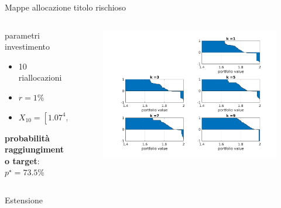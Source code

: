 \begin{frame}{Mappe allocazione titolo rischioso}
	\begin{columns}
		\begin{column}{0.4\textwidth}
			\begin{block}{parametri investimento}
				\begin{itemize}
					\item 10 riallocazioni 
					\item $r=1\%$
					\item $X_{10} = [1.07^4,\infty]$
				\end{itemize}
			\end{block}
			\textbf{probabilità raggiungimento target}:
			$p^{\star}=73.5\%$
		\end{column}
		\begin{column}{0.6\textwidth}
			\begin{figure}
				\centering
				\includegraphics[width=1.1\linewidth]{Images/mapsbasic}
			\end{figure}
		\end{column}
	\end{columns}
\end{frame}

\begin{frame}{Estensione}
	
	
\end{frame}




